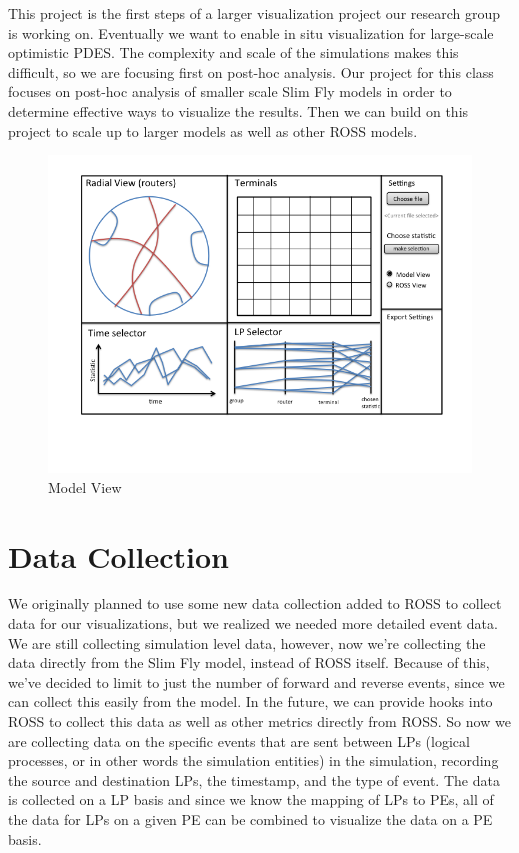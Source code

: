 \documentclass{acm_proc_article-sp}
\begin{document}
This project is the first steps of a larger visualization project our research group is working on.  Eventually we want to enable in situ visualization for large-scale optimistic PDES.  The complexity and scale of the simulations makes this difficult, so we are focusing first on post-hoc analysis.  Our project for this class focuses on post-hoc analysis of smaller scale Slim Fly models in order to determine effective ways to visualize the results.   Then we can build on this project to scale up to larger models as well as other ROSS models.

\vspace{1cm}
\begin{figure}[!ht]
\centering
   \includegraphics[width=5.0in, clip=true, trim=0 1in 0 0]{../../figures/gui-diagram/Slide1.png}
\caption{Model View}
\label{model-view}
\end{figure}
\section{Data Collection}

We originally planned to use some new data collection added to ROSS to collect data for our visualizations, but we realized we needed more detailed event data. We are still collecting simulation level data, however, now we're collecting the data directly from the Slim Fly model, instead of ROSS itself.  Because of this, we've decided to limit to just the number of forward and reverse events, since we can collect this easily from the model.  In the future, we can provide hooks into ROSS to collect this data as well as other metrics directly from ROSS.  So now we are collecting data on the specific events that are sent between LPs (logical processes, or in other words the simulation entities) in the simulation, recording the source and destination LPs, the timestamp, and the type of event.  The data is collected on a LP basis and since we know the mapping of LPs to PEs, all of the data for LPs on a given PE can be combined to visualize the data on a PE basis.  
\end{document}
